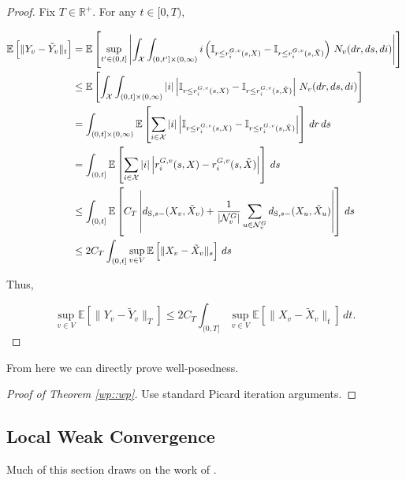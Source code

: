 \documentclass[12pt]{article}
\newcommand{\mb}{\mathbb}
\newcommand{\mc}{\mathcal}
\newcommand{\te}{\text}
\newcommand{\ex}[1]{\mb{E}\left[#1\right]}			%
\newcommand{\sta}{\mc{X}}							%
\newcommand{\gneigh}[2]{\mc{N}^{#1}_{#2}}			%
\newcommand{\Xf}{X}									%
\newcommand{\poiss}{N}								%
\newcommand{\rate}{r}								%
\newcommand{\stmet}[1]{
\ifstrempty{#1}{
	d_{\te{S}}}{
	d_{\te{S},#1}}}									%
\newcommand{\poissv}[1]{_{#1}}						%
\newcommand{\vind}[1]{_{#1}}						%
\newcommand{\stpara}[1]{_{#1}}						%
\newcommand{\tpara}[1]{_{#1}}						%
\newcommand{\gvpara}[2]{^{#1,#2}}					%
\newcommand{\jumpbd}[1]{C_{#1}}						%
\newcommand{\tmepro}[2]{(#1,#2)}					%
\newcommand{\Xg}{Y}									%
\newcommand{\alt}[1]{\tilde{#1}}					%
\begin{document}
\begin{proof}
Fix \(T \in \mb{R}^+\). For any \(t \in [0,T)\),

\begin{align*}
\ex{\|\Xg\vind{v} - \alt{\Xg}\vind{v}\|\tpara{t}} &= \ex{\sup_{t' \in (0,t]}\left|\int_\sta\int_{(0,t']\times (0,\infty)} i\left(\mb{I}_{r \leq \rate\gvpara{G}{v}\stpara{i}\tmepro{s}{\Xf}} - \mb{I}_{r \leq \rate\gvpara{G}{v}\stpara{i}\tmepro{s}{\alt{\Xf}}}\right)\,\poiss\poissv{v}(dr,ds,di)\right|}\\
&\leq \ex{\int_\sta\int_{(0,t]\times (0,\infty)} |i|\left|\mb{I}_{r \leq \rate\gvpara{G}{v}\stpara{i}\tmepro{s}{\Xf}} - \mb{I}_{r \leq \rate\gvpara{G}{v}\stpara{i}\tmepro{s}{\alt{\Xf}}}\right|\,\poiss\poissv{v}(dr,ds,di)}\\
&= \int_{(0,t]\times (0,\infty)}\ex{\sum_{i\in \sta}|i|\left|\mb{I}_{r \leq \rate\gvpara{G}{v}\stpara{i}\tmepro{s}{\Xf}} - \mb{I}_{r \leq \rate\gvpara{G}{v}\stpara{i}\tmepro{s}{\alt{\Xf}}}\right|}\,dr\,ds\\
&= \int_{(0,t]}\ex{\sum_{i\in \sta}|i|\left|\rate\gvpara{G}{v}\stpara{i}\tmepro{s}{\Xf} - \rate\gvpara{G}{v}\stpara{i}\tmepro{s}{\alt{\Xf}}\right|}\,ds\\
&\leq \int_{(0,t]}\ex{\jumpbd{T}\left|\stmet{s-}(\Xf\vind{v},\alt{\Xf}\vind{v}) + \frac{1}{|\gneigh{G}{v}|}\sum_{u\in \gneigh{G}{v}} \stmet{s-}(\Xf\vind{u},\alt{\Xf}\vind{u}) \right|}\,ds\\
&\leq 2\jumpbd{T} \int_{(0,t]} \sup_{v \in V} \ex{\|\Xf\vind{v} - \alt{\Xf}\vind{v}\|\tpara{s}}\,ds
\end{align*}

Thus,

\[\sup_{v\in V}\ex{\|\Xg\vind{v} - \alt{\Xg}\vind{v}\|\tpara{T}} \leq 2\jumpbd{T} \int_{(0,T]} \sup_{v \in V} \ex{\|\Xf\vind{v} - \alt{\Xf}\vind{v}\|\tpara{t}}\,dt.\]
\end{proof}

From here we can directly prove well-posedness.

\begin{proof}[Proof of Theorem \ref{wp::wp}]
Use standard Picard iteration arguments.
\end{proof}

\subsection{Local Weak Convergence}
\label{awl::lwc}

Much of this section draws on the work of \cite{LacRamWu19}.
\end{document}

